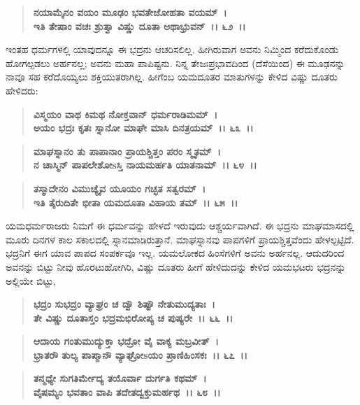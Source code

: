 \begin{verse}
\textbf{ನಯಾಮೈನಂ ವಯಂ ಮೂಢಂ ಭವತೇಜೋಹತಾ ವಯಮ್~।}\\\textbf{ಇತಿ ತೇಷಾಂ ವಚಃ ಶ್ರುತ್ವಾ ವಿಷ್ಣು ದೂತಾ ಅಥಾಭ್ರುವನ್~।। ೬೨~।।}
\end{verse}

ಇಂತಹ ಧರ್ಮಗಳಲ್ಲಿ ಯಾವುದನ್ನೂ ಈ ಭದ್ರನು ಆಚರಿಸಲಿಲ್ಲ. ಹೀಗಿರುವಾಗ ಅವನು ನಿಮ್ಮಿಂದ ಕರೆದುಕೊಂಡು ಹೋಗಲ್ಪಡಲು ಅರ್ಹನಲ್ಲ; ಅವನು ಮಹಾ ಪಾಪಿಷ್ಟನು. ನಿನ್ನ ತೇಜಃಪ್ರಭಾವದಿಂದ (ದೆಸೆಯಿಂದ) ಈ ಮೂಢನನ್ನು ನಾವೂ ಸಹ ಕರೆದೊಯ್ಯಲು ಶಕ್ತಿಯುತರಾಗಿಲ್ಲ. ಹೀಗೆಂಬ ಯಮದೂತರ ಮಾತುಗಳನ್ನು ಕೇಳಿದ ವಿಷ್ಣು ದೂತರು ಹೇಳಿದರು:

\begin{verse}
\textbf{ವಿಸ್ಮಯಂ ವಾಥ ಕಿಮಥ ನೋಕ್ತವಾನ್ ಧರ್ಮರಾಡಿಮಮ್~।}\\\textbf{ಅಯಂ ಭದ್ರಃ ಕೃತಃ ಸ್ನಾನೋ ಮಾಘೇ ಮಾಸಿ ದಿನತ್ರಯಮ್~।। ೬೩~।। }
\end{verse}

\begin{verse}
\textbf{ಮಾಘಸ್ನಾನಂ ತು ಪಾಪಾನಾಂ ಪ್ರಾಯಶ್ಚಿತ್ತಂ ಪರಂ ಸ್ಮೃತಮ್~।}\\\textbf{ನ ಚಾಸ್ಮಿನ್ ಪಾಪಲೇಶೋsಸ್ತಿ ನಾಯಮರ್ಹತಿ ಯಾತನಾಮ್~।। ೬೪~।। }
\end{verse}

\begin{verse}
\textbf{ತಸ್ಮಾದೇನಂ ವಿಮುಚ್ಯೈವ ಯೂಯಂ ಗಚ್ಛತ ಸತ್ವರಮ್~।}\\\textbf{ಇತಿ ತೈರುದಿತೇ ಭೀತಾ ಯಮದೂತಾ ವಿಹಾಯ ತಮ್~।। ೬೫~।।}
\end{verse}

ಯಮಧರ್ಮರಾಜರು ನಿಮಗೆ ಈ ಧರ್ಮವನ್ನು ಹೇಳದೆ ಇರುವುದು ಆಶ್ಚರ್ಯವಾಗಿದೆ. ಈ ಭದ್ರನು ಮಾಘಮಾಸದಲ್ಲಿ ಮೂರು ದಿನಗಳ ಕಾಲ ಸಕಾಲದಲ್ಲಿ ಸ್ನಾನಮಾಡಿರುತ್ತಾನೆ. ಮಾಘಸ್ನಾನವು ಪಾಪಗಳಿಗೆ ಪ್ರಾಯಶ್ಚಿತ್ತವೆಂದು ಹೇಳಲ್ಪಟ್ಟಿದೆ. ಭದ್ರನಿಗೆ ಈಗ ಯಾವ ಪಾಪದ ಸಂಪರ್ಕವೂ ಇಲ್ಲ. ಯಮಲೋಕದ ಹಿಂಸೆಗಳಿಗೆ ಅವನು ಅರ್ಹನಲ್ಲ. ಆದುದರಿಂದ ಅವನನ್ನು ಬಿಟ್ಟು ನೀವು ಹೊರಟುಹೋಗಿರಿ, ವಿಷ್ಣು ದೂತರು ಹೀಗೆ ಹೇಳಿದುದನ್ನು ಕೇಳಿದ ಯಮಭಟರು ಭದ್ರನನ್ನು ಅಲ್ಲಿಯೇ ಬಿಟ್ಟು,

\begin{verse}
\textbf{ಭದ್ರಂ ಸುಭದ್ರಂ ವ್ಯಾಘ್ರಂ ಚ ದ್ವೌ ಶಿಷ್ಟೌ ನೇತುಮುದ್ಯತಾಃ~।}\\\textbf{ತೇ ವಿಷ್ಣು ದೂತಾಸ್ತಂ ಭದ್ರಮಭಿರೋಪ್ಯ ಚ ಪುಷ್ಯರೇ~।। ೬೬~।। }
\end{verse}

\begin{verse}
\textbf{ಆದಾಯ ಗಂತುಮುದ್ಯುಕ್ತಾ ಭದ್ರೋ ವೈ ವಾಕ್ಯ ಮಬ್ರವೀತ್~।}\\\textbf{ಭ್ರಾತರೌ ತುಲ್ಯ ಪಾಪ್ಮಾನೌ ವ್ಯಾಘ್ರೋsಯಂ ಪ್ರಾಣಿಹಿಂಸಕಃ~।। ೬೭~।।} 
\end{verse}

\begin{verse}
\textbf{ತನ್ಮಧ್ಯೇ ಸುಗತಿರ್ಮೇದ್ಯ ತಯೊರ್ವಾ ದುರ್ಗತಿ ಕಥಮ್~।}\\\textbf{ವೈಷಮ್ಯಂ ಭವತಾಂ ವಾಪಿ ತದೇತದ್ವಕ್ತುಮರ್ಹಥ~।। ೬೮~।।}
\end{verse}

